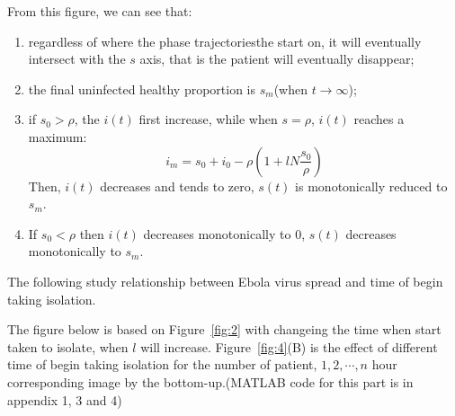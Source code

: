 From this figure, we can see that:
\begin{enumerate}
  \item regardless of where the phase trajectoriesthe start on,
   it will eventually intersect with the $s$ axis,
   that is the patient will eventually disappear;
  \item the final uninfected healthy proportion is
   $s_m$(when $t\rightarrow\infty$);
  \item if $s_0>\rho$, the $i(t)$ first increase, while when 
   $s=\rho$, $i(t)$ reaches a maximum:
   $$
	i_m=s_0+i_0-\rho(1+lN\frac{s_0}{\rho})
   \label{equ:11}
   $$
   Then, $i(t)$ decreases and tends to zero, $s(t)$ is
   monotonically reduced to $s_m$.
  \item If $s_0<\rho$ then $i(t)$ decreases monotonically to
   0, $s(t)$ decreases monotonically to $s_m$.
\end{enumerate}
The following study relationship between Ebola virus spread and
time of begin taking isolation.\par
The figure below is based on Figure~\ref{fig:2} with changeing
the time when start taken to isolate, when $l$ will increase.
Figure~\ref{fig:4}(B) is the effect of different time of begin taking 
isolation for the number of patient, $1,2,\cdots,n$ hour
corresponding image by the bottom-up.(MATLAB code for this part
is in appendix 1, 3 and 4)\par
